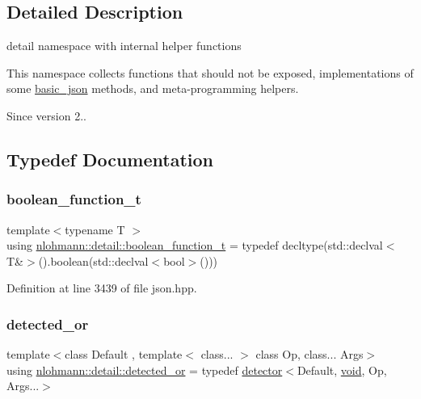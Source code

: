 \subsection{Detailed Description}
detail namespace with internal helper functions 

This namespace collects functions that should not be exposed, implementations of some \mbox{\hyperlink{classnlohmann_1_1basic__json}{basic\+\_\+json}} methods, and meta-\/programming helpers.

\begin{DoxySince}{Since}
version 2.. 
\end{DoxySince}


\subsection{Typedef Documentation}
\mbox{\label{namespacenlohmann_1_1detail_a45ec87326503b8884b664a9ef23a6c99}} 
\subsubsection{\texorpdfstring{boolean\_function\_t}{boolean\_function\_t}}
{\footnotesize\ttfamily template$<$typename T $>$ \\
using \mbox{\hyperlink{namespacenlohmann_1_1detail_a45ec87326503b8884b664a9ef23a6c99}{nlohmann\+::detail\+::boolean\+\_\+function\+\_\+t}} = typedef decltype(std\+::declval$<$T\&$>$().boolean(std\+::declval$<$bool$>$()))}



Definition at line 3439 of file json.\+hpp.

\mbox{\label{namespacenlohmann_1_1detail_a240ce21919ab08e8a6cb3a5cfa412bce}} 
\subsubsection{\texorpdfstring{detected\_or}{detected\_or}}
{\footnotesize\ttfamily template$<$class Default , template$<$ class... $>$ class Op, class... Args$>$ \\
using \mbox{\hyperlink{namespacenlohmann_1_1detail_a240ce21919ab08e8a6cb3a5cfa412bce}{nlohmann\+::detail\+::detected\+\_\+or}} = typedef \mbox{\hyperlink{structnlohmann_1_1detail_1_1detector}{detector}}$<$Default, \mbox{\hyperlink{namespacenlohmann_1_1detail_a59fca69799f6b9e366710cb9043aa77d}{void}}, Op, Args...$>$}



